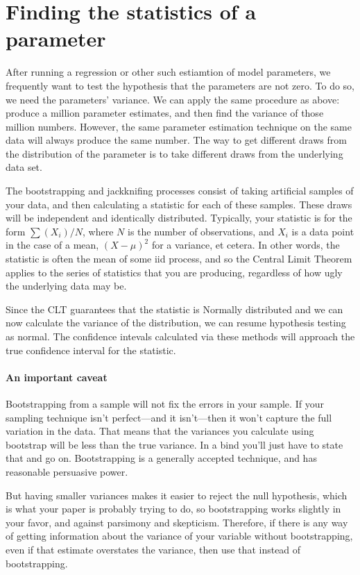 \section{Finding the statistics of a parameter}
After running a regression or other such estiamtion of model parameters,
we frequently want to test the hypothesis that the parameters are not
zero. To do so, we need the parameters' variance.
We can apply the same procedure as above: produce a million parameter
estimates, and then find the variance of those million numbers. However,
the same parameter estimation technique on the same data will always
produce the same number. The way to get different draws from the
distribution of the parameter is to take different draws from the
underlying data set.

The bootstrapping and jackknifing processes consist of taking artificial
samples of your data, and then calculating a statistic for each of these
samples. These draws will be independent and identically distributed.
Typically, your statistic is for the form $\sum (X_i)/ N$, where  $N$
is the number of observations, and $X_i$ is a data point in the case
of a mean, $(X-\mu)^2$ for a variance, et cetera. In other words, the
statistic is often the mean of some iid process, and so the Central
Limit Theorem applies to the series of statistics that you are
producing, regardless of how ugly the underlying data may be.

Since the CLT guarantees that the  statistic is Normally distributed
and we can now calculate the variance of the distribution, we can resume
hypothesis testing as normal. The confidence intevals calculated via these
methods will approach the true confidence interval for the statistic.

\paragraph{An important caveat} Bootstrapping from a sample will not fix
the errors in your sample. If your sampling technique isn't perfect---and
it isn't---then it won't capture the full variation in the data. That
means that the variances you calculate using bootstrap will be less than
the true variance. In a bind you'll just have
to state that and go on. Bootstrapping is a generally accepted technique,
and has reasonable persuasive power.

But having smaller variances makes
it easier to reject the null hypothesis, which is what your paper is
probably trying to do, so bootstrapping works slightly in your favor,
and against parsimony and skepticism. Therefore, if there is any way
of getting information about the variance of your variable without
bootstrapping, even if that estimate overstates the variance, then use
that instead of bootstrapping. 


